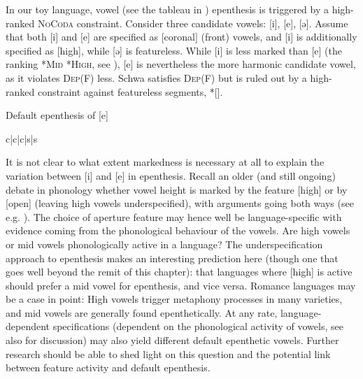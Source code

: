 \documentclass[output=paper,colorlinks,citecolor=brown]{langscibook}
\begin{document}
In our toy language, vowel (see the tableau in ) epenthesis is triggered by a high-ranked \textsc{NoCoda} constraint. Consider three candidate vowels: [i], [e], [ə]. Assume that both [i] and [e] are specified as [coronal] (front) vowels, and [i] is additionally specified as [high], while [ə] is featureless. While [i] is less marked than [e] (the ranking \textsc{*Mid \frqq{} *High}, see \citealt{lombardi03}), [e] is nevertheless the more harmonic candidate vowel, as it violates \textsc{Dep}(F) less. Schwa satisfies \textsc{Dep}(F) but is ruled out by a high-ranked constraint against featureless segments, *[].


\begin{table}
\caption{Default epenthesis of [e]}
\label{tableau3:tbl1}
\ShadingOn
\begin{tableau}{c|c|c|s|s} 
     \const{*[]}     
\cand{[pat]}                \vio{*!}  \vio{} \vio{}                                           \vio{} \vio{}   
\cand{[pati]}              \vio{}  \vio{}                                            \vio{} \vio{*}    
\cand[\Optimal]{[pate]}    \vio{}  \vio{}                                        \vio{*} \vio{}  
\cand{[patə]}     \vio{}  \vio{*!} \vio{}                                           \vio{} \vio{}  
\end{tableau}
\end{table}


It is not clear to what extent markedness is necessary at all to explain the variation between [i] and [e] in epenthesis. Recall an older (and still ongoing) debate in phonology whether vowel height is marked by the feature [high] or by [open] (leaving high vowels underspecified), with arguments going both ways (see e.g. \citealt{clements90}). The choice of aperture feature may hence well be language-specific with evidence coming from the phonological behaviour of the vowels. Are high vowels or mid vowels phonologically active in a language? The underspecification approach to epenthesis makes an interesting prediction here (though one that goes well beyond the remit of this chapter): that languages where [high] is active should prefer a mid vowel for epenthesis, and vice versa. Romance languages may be a case in point: High vowels trigger metaphony processes in many varieties, and mid vowels are generally found epenthetically. At any rate, language-dependent specifications (dependent on the phonological activity of vowels, see also \citealt{dresher09} for discussion) may also yield different default epenthetic vowels. Further research should be able to shed light on this question and the potential link between feature activity and default epenthesis.
\end{document}
